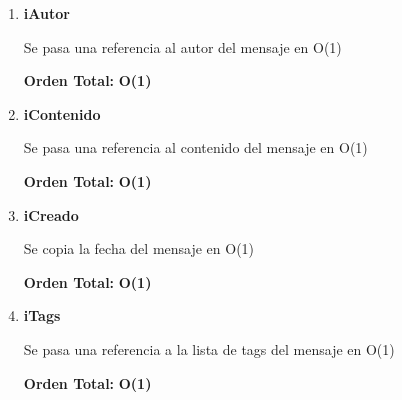 \vspace*{1em}
\begin{enumerate}

\item\textbf{iAutor}
\par Se pasa una referencia al autor del mensaje en O(1)
\par \textbf{Orden Total:} \textbf{O(1)}

\item\textbf{iContenido}
\par Se pasa una referencia al contenido del mensaje en O(1)
\par \textbf{Orden Total:} \textbf{O(1)}

\item\textbf{iCreado}
\par Se copia la fecha del mensaje en O(1)
\par \textbf{Orden Total:} \textbf{O(1)}

\item\textbf{iTags}
\par Se pasa una referencia a la lista de tags del mensaje en O(1)
\par \textbf{Orden Total:} \textbf{O(1)}






\end{enumerate}



